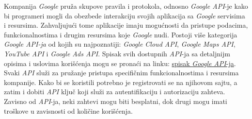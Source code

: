 \documentclass[android.tex]{subfiles}
\begin{document}
Kompanija \textit{Google} pruža skupove pravila i protokola, odnosno \textit{Google API}-je kako bi programeri mogli da obezbede interakciju svojih aplikacija sa \textit{Google} servisima i resursima. Zahvaljujući tome aplikacije imaju mogućnosti da pristupe podacima, funkcionalnostima i drugim resursima koje \textit{Google} nudi. Postoji više kategorija \textit{Google API-ja} od kojih su najpoznatiji: \textit{Google Cloud API}, \textit{Google Maps API}, \textit{YouTube API} i \textit{Google Ads API}. Spisak svih dostupnih \textit{API}-ja sa detaljnijm opisima i uslovima korišćenja mogu se pronaći na linku: \href{https://developers.google.com/apis-explorer}{spisak \textit{Google API}-ja}.  Svaki \textit{API} služi za pružanje pristupa specifičnim funkcionalnostima i resursima kompanije. Kako bi se koristili potrebno je registrovati se na njihovom sajtu, a zatim i dobiti \textit{API} ključ koji služi za autentifikaciju i autorizaciju zahteva. Zavisno od \textit{API}-ja, neki zahtevi mogu biti besplatni, dok drugi mogu imati troškove u zavisnosti od količine korišćenja.  
\end{document}
